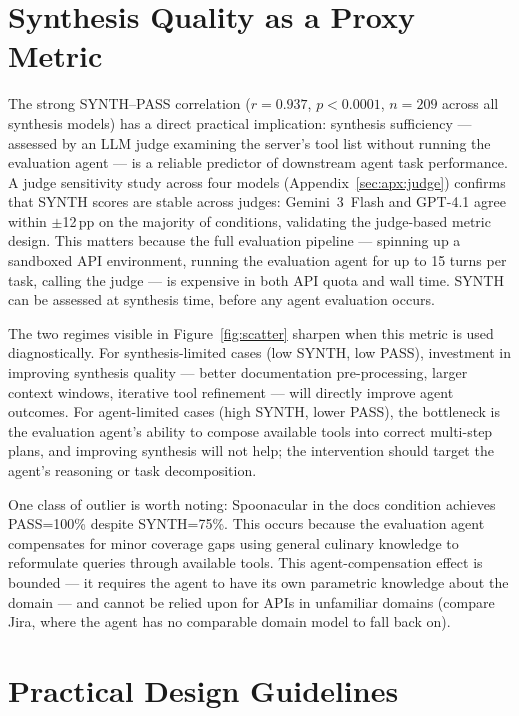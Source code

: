 \section{Synthesis Quality as a Proxy Metric}
\label{sec:discussion-proxy}

The strong SYNTH--PASS correlation ($r = 0.937$, $p < 0.0001$, $n = 209$ across all synthesis models) has a direct practical implication: synthesis sufficiency --- assessed by an LLM judge examining the server's tool list without running the evaluation agent --- is a reliable predictor of downstream agent task performance. A judge sensitivity study across four models (Appendix~\ref{sec:apx:judge}) confirms that SYNTH scores are stable across judges: Gemini~3~Flash and GPT-4.1 agree within $\pm$12\,pp on the majority of conditions, validating the judge-based metric design. This matters because the full evaluation pipeline --- spinning up a sandboxed API environment, running the evaluation agent for up to 15 turns per task, calling the judge --- is expensive in both API quota and wall time. SYNTH can be assessed at synthesis time, before any agent evaluation occurs.

The two regimes visible in Figure~\ref{fig:scatter} sharpen when this metric is used diagnostically. For synthesis-limited cases (low SYNTH, low PASS), investment in improving synthesis quality --- better documentation pre-processing, larger context windows, iterative tool refinement --- will directly improve agent outcomes. For agent-limited cases (high SYNTH, lower PASS), the bottleneck is the evaluation agent's ability to compose available tools into correct multi-step plans, and improving synthesis will not help; the intervention should target the agent's reasoning or task decomposition.

One class of outlier is worth noting: Spoonacular in the docs condition achieves PASS=100\% despite SYNTH=75\%. This occurs because the evaluation agent compensates for minor coverage gaps using general culinary knowledge to reformulate queries through available tools. This agent-compensation effect is bounded --- it requires the agent to have its own parametric knowledge about the domain --- and cannot be relied upon for APIs in unfamiliar domains (compare Jira, where the agent has no comparable domain model to fall back on).

\section{Practical Design Guidelines}
\label{sec:discussion-guidelines}

